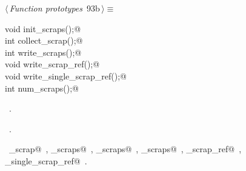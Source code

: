 \documentclass[a4paper]{report}
\begin{document}
\begin{flushleft} \small
\begin{minipage}{\linewidth}\label{scrap191}\raggedright\small
{} $\langle\,${\it Function prototypes}\nobreak\ {\footnotesize {93b}}$\,\rangle\equiv$
\vspace{-1ex}
\begin{list}{}{} \item
\mbox{}\verb@extern void init_scraps();@\\
\mbox{}\verb@extern int collect_scrap();@\\
\mbox{}\verb@extern int write_scraps();@\\
\mbox{}\verb@extern void write_scrap_ref();@\\
\mbox{}\verb@extern void write_single_scrap_ref();@\\
\mbox{}\verb@extern int num_scraps();@\\
\mbox{}\verb@@{\NWsep}
\end{list}
\vspace{-1.5ex}
\footnotesize
\begin{list}{}{\setlength{\itemsep}{-\parsep}\setlength{\itemindent}{-\leftmargin}}
\item \NWtxtMacroDefBy\ .
\item \NWtxtMacroRefIn\ .
\item \NWtxtIdentsUsed\nobreak\  \verb@collect_scrap@\nobreak\ , \verb@init_scraps@\nobreak\ , \verb@num_scraps@\nobreak\ , \verb@write_scraps@\nobreak\ , \verb@write_scrap_ref@\nobreak\ , \verb@write_single_scrap_ref@\nobreak\ .
\item{}
\end{list}
\end{minipage}\vspace{4ex}
\end{flushleft}
\end{document}

